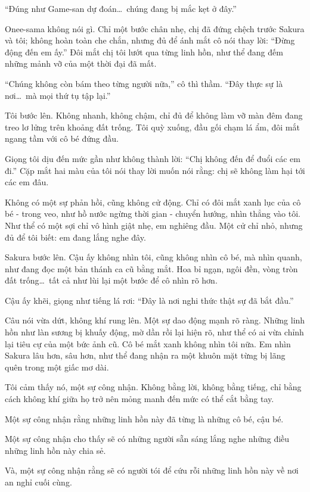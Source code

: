\documentclass[../main.tex]{subfiles}
\begin{document}
``Đúng như Game-san dự đoán\dots\ chúng đang bị mắc kẹt ở đây.''

Onee-sama không nói gì. Chỉ một bước chân nhẹ, chị đã đứng chệch trước Sakura và tôi; không hoàn toàn che chắn, nhưng đủ để ánh mắt cô nói thay lời: ``Đừng động đến em ấy.'' Đôi mắt chị tôi lướt qua từng linh hồn, như thể đang đếm những mảnh vỡ của một thời đại đã mất.

``Chúng không còn bám theo từng người nữa,'' cô thì thầm. ``Đây thực sự là nơi\dots\ mà mọi thứ tụ tập lại.''

Tôi bước lên. Không nhanh, không chậm, chỉ đủ để không làm vỡ màn đêm đang treo lơ lửng trên khoảng đất trống. Tôi quỳ xuống, đầu gối chạm lá ẩm, đôi mắt ngang tầm với cô bé đứng đầu.

Giọng tôi dịu đến mức gần như không thành lời: ``Chị không đến để đuổi các em đi.'' Cặp mắt hai màu của tôi nói thay lời muốn nói rằng: chị sẽ không làm hại tới các em đâu.

Không có một sự phản hồi, cũng không cử động. Chỉ có đôi mắt xanh lục của cô bé - trong veo, như hồ nước ngừng thời gian - chuyển hướng, nhìn thẳng vào tôi. Như thể có một sợi chỉ vô hình giật nhẹ, em nghiêng đầu. Một cử chỉ nhỏ, nhưng đủ để tôi biết: em đang lắng nghe đây.

Sakura bước lên. Cậu ấy không nhìn tôi, cũng không nhìn cô bé, mà nhìn quanh, như đang đọc một bản thánh ca cũ bằng mắt. Hoa bỉ ngạn, ngôi đền, vòng tròn đất trống\dots\ tất cả như lùi lại một bước để cô nhìn rõ hơn.

Cậu ấy khẽi, giọng như tiếng lá rơi: ``Đây là nơi nghi thức thật sự đã bắt đầu.''

Câu nói vừa dứt, không khí rung lên. Một sự dao động mạnh rõ ràng. Những linh hồn như làn sương bị khuấy động, mờ dần rồi lại hiện rõ, như thể có ai vừa chỉnh lại tiêu cự của một bức ảnh cũ. Cô bé mắt xanh không nhìn tôi nữa. Em nhìn Sakura lâu hơn, sâu hơn, như thể đang nhận ra một khuôn mặt từng bị lãng quên trong một giấc mơ dài.

Tôi cảm thấy nó, một sự công nhận. Không bằng lời, không bằng tiếng, chỉ bằng cách không khí giữa họ trở nên mỏng manh đến mức có thể cắt bằng tay.

Một sự công nhận rằng những linh hồn này đã từng là những cô bé, cậu bé.

Một sự công nhận cho thấy sẽ có những người sẵn sáng lắng nghe những điều những linh hồn này chia sẻ.

Và, một sự công nhận rằng sẽ có người tói để cứu rỗi những linh hồn này về nơi an nghỉ cuối cùng.
\end{document}
